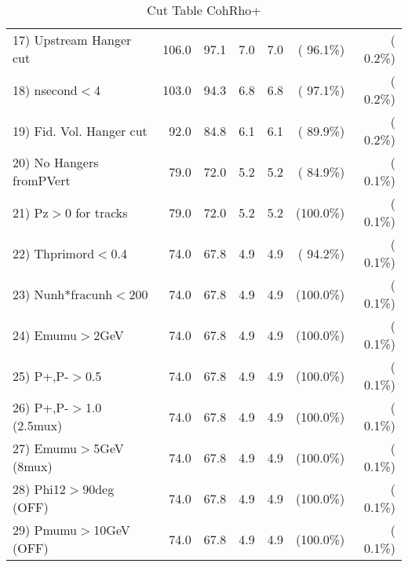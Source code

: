 \begin{table}[h!]
\begin{tabular}{||l||r|r|r|r|r|r||}
 17) Upstream Hanger cut  &        106.0 &         97.1 &          7.0 &          7.0 & ( 96.1\%) & (  0.2\%) \\
 18) nsecond$<$4          &        103.0 &         94.3 &          6.8 &          6.8 & ( 97.1\%) & (  0.2\%) \\
 19) Fid. Vol. Hanger cut &         92.0 &         84.8 &          6.1 &          6.1 & ( 89.9\%) & (  0.2\%) \\
 20) No Hangers fromPVert &         79.0 &         72.0 &          5.2 &          5.2 & ( 84.9\%) & (  0.1\%) \\
 21) Pz$>$0 for tracks    &         79.0 &         72.0 &          5.2 &          5.2 & (100.0\%) & (  0.1\%) \\
 22) Thprimord$<$0.4      &         74.0 &         67.8 &          4.9 &          4.9 & ( 94.2\%) & (  0.1\%) \\
 23) Nunh*fracunh$<$200   &         74.0 &         67.8 &          4.9 &          4.9 & (100.0\%) & (  0.1\%) \\
 24) Emumu$>$2GeV         &         74.0 &         67.8 &          4.9 &          4.9 & (100.0\%) & (  0.1\%) \\
 25) P+,P-$>$0.5          &         74.0 &         67.8 &          4.9 &          4.9 & (100.0\%) & (  0.1\%) \\
 26) P+,P-$>$1.0 (2.5mux) &         74.0 &         67.8 &          4.9 &          4.9 & (100.0\%) & (  0.1\%) \\
 27) Emumu$>$5GeV  (8mux) &         74.0 &         67.8 &          4.9 &          4.9 & (100.0\%) & (  0.1\%) \\
 28) Phi12$>$90deg  (OFF) &         74.0 &         67.8 &          4.9 &          4.9 & (100.0\%) & (  0.1\%) \\
 29) Pmumu$>$10GeV  (OFF) &         74.0 &         67.8 &          4.9 &          4.9 & (100.0\%) & (  0.1\%) \\
 \hline
 \hline
 \end{tabular}
 \caption{Cut Table  CohRho+  }
 \label{tab-cutcohjpsi-mumu_anumunc}
 \end{table}
